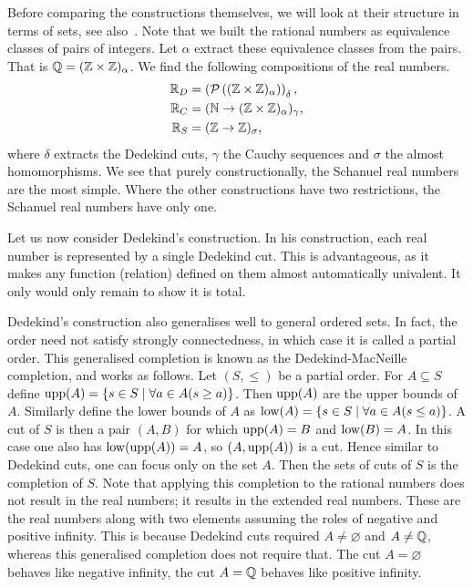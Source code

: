 \documentclass[../main.tex]{subfiles}
\begin{document}
Before comparing the constructions themselves, we will look at their structure in terms of sets, see also~\cite{Borovik2012}. Note that we built the rational numbers as equivalence classes of pairs of integers. Let $\alpha$ extract these equivalence classes from the pairs. That is $\mathbb{Q}=(\mathbb{Z}\times\mathbb{Z})_\alpha$. We find the following compositions of the real numbers.
\begin{align*}
    \mathbb{R}_D & =\left(\mathcal{P}\left((\mathbb{Z}\times\mathbb{Z})_\alpha\right)\right)_\delta, \\
    \mathbb{R}_C & =(\mathbb{N}\to(\mathbb{Z}\times\mathbb{Z})_\alpha)_\gamma, \\
    \mathbb{R}_S & =(\mathbb{Z}\to\mathbb{Z})_\sigma,
\end{align*}
where $\delta$ extracts the Dedekind cuts, $\gamma$ the Cauchy sequences and $\sigma$ the almost homomorphisms. We see that purely constructionally, the Schanuel real numbers are the most simple. Where the other constructions have two restrictions, the Schanuel real numbers have only one.

Let us now consider Dedekind's construction. In his construction, each real number is represented by a single Dedekind cut. This is advantageous, as it makes any function (relation) defined on them almost automatically univalent. It only would only remain to show it is total. 

Dedekind's construction also generalises well to general ordered sets. In fact, the order need not satisfy strongly connectedness, in which case it is called a partial order. This generalised completion is known as the Dedekind-MacNeille completion, and works as follows. Let $(S,\leq)$ be a partial order. For $A\subseteq S$ define $\operatorname{upp}(A)=\{s\in S\mid\forall a\in A(s\geq a)\}$. Then $\operatorname{upp}(A)$ are the upper bounds of $A$. Similarly define the lower bounds of $A$ as $\operatorname{low}(A)=\{s\in S\mid\forall a\in A(s\leq a)\}$. A cut of $S$ is then a pair $(A,B)$ for which $\operatorname{upp}(A)=B$ and $\operatorname{low}(B)=A$. In this case one also has $\operatorname{low}(\operatorname{upp}(A))=A$, so $(A,\operatorname{upp}(A))$ is a cut. Hence similar to Dedekind cuts, one can focus only on the set $A$. Then the sets of cuts of $S$ is the completion of $S$. Note that applying this completion to the rational numbers does not result in the real numbers; it results in the extended real numbers. These are the real numbers along with two elements assuming the roles of negative and positive infinity. This is because Dedekind cuts required $A\neq\varnothing$ and $A\neq\mathbb{Q}$, whereas this generalised completion does not require that. The cut $A=\varnothing$ behaves like negative infinity, the cut $A=\mathbb{Q}$ behaves like positive infinity.
\end{document}
